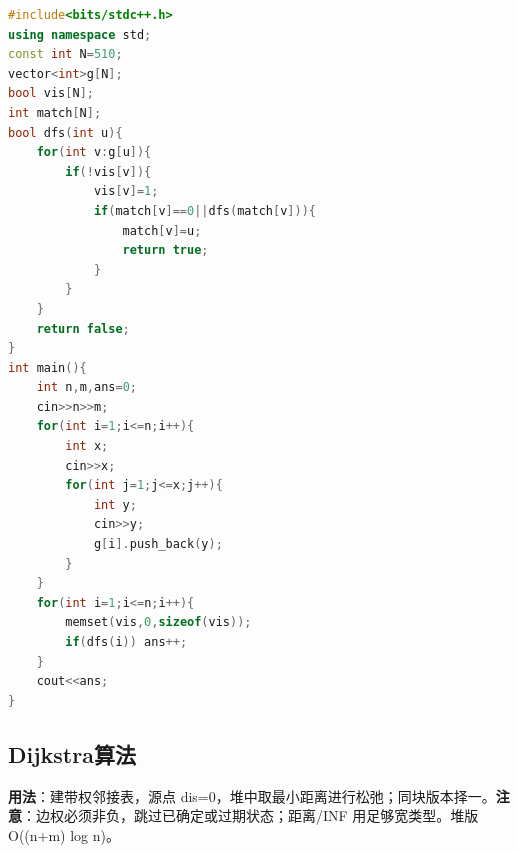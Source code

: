 \documentclass[a4paper,9pt]{extarticle}
\begin{document}
\begin{lstlisting}[language={C++}]
#include<bits/stdc++.h>
using namespace std;
const int N=510;
vector<int>g[N];
bool vis[N];
int match[N];
bool dfs(int u){
    for(int v:g[u]){
        if(!vis[v]){
            vis[v]=1;
            if(match[v]==0||dfs(match[v])){
                match[v]=u;
                return true;
            }
        }
    }
    return false;
}
int main(){
    int n,m,ans=0;
    cin>>n>>m;
    for(int i=1;i<=n;i++){
        int x;
        cin>>x;
        for(int j=1;j<=x;j++){
            int y;
            cin>>y;
            g[i].push_back(y);
        }
    }
    for(int i=1;i<=n;i++){
        memset(vis,0,sizeof(vis));
        if(dfs(i)) ans++;
    }
    cout<<ans;
}
\end{lstlisting}

\subsection{Dijkstra算法}

\textbf{用法}：建带权邻接表，源点 dis=\allowbreak{}0，堆中取最小距离进行松弛；同块版本择一。\textbf{注意}：边权必须非负，跳过已确定或过期状态；距离/\allowbreak{}INF 用足够宽类型。堆版 O((n+m) log n)。
\end{document}
